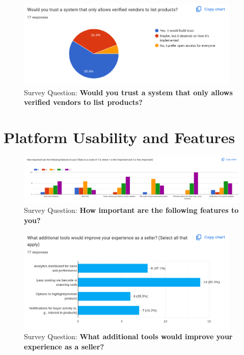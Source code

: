 \documentclass[12pt]{report}
\begin{document}
\begin{appendices}
	\begin{figure}[H]
		\begin{center}
			\includegraphics[width=0.95\textwidth]{survey/q15}
		\end{center}
		\caption{Survey Question: \textbf{Would you trust a system that only allows verified vendors to list products?}}
	\end{figure}

	\section{Platform Usability and Features}

	\begin{figure}[H]
		\begin{center}
			\includegraphics[width=1\textwidth]{survey/q16}
		\end{center}
		\caption{Survey Question: \textbf{How important are the following features to you? }}
	\end{figure}

	\begin{figure}[H]
		\begin{center}
			\includegraphics[width=0.95\textwidth]{survey/q17}
		\end{center}
		\caption{Survey Question: \textbf{What additional tools would improve your experience as a seller?}}
	\end{figure}


\end{appendices}
\end{document}
